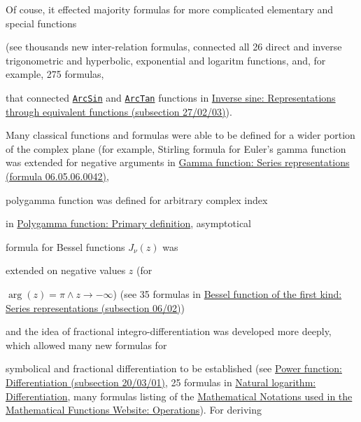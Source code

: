 Of couse, it effected majority formulas for more complicated elementary and special functions 

(see thousands new inter-relation formulas, connected all 26 direct and inverse trigonometric and hyperbolic, exponential and logaritm functions, and, for example, 275 formulas, 

that connected \href{http://reference.wolfram.com/language/ref/ArcSin.html}{\tt ArcSin} and \href{http://reference.wolfram.com/language/ref/ArcTan.html}{\tt ArcTan} functions in \href{http://functions.wolfram.com/ElementaryFunctions/ArcSin/27/02/03}{Inverse sine: Representations through equivalent functions (subsection 27/02/03)}).

Many classical functions and formulas were able to be defined for a wider portion of the complex plane  (for example, Stirling formula for Euler's gamma function was extended for negative arguments in \href{http://functions.wolfram.com/GammaBetaErf/Gamma/06/02/0005/}{Gamma function: Series representations (formula 06.05.06.0042)}, 

polygamma function was defined for arbitrary complex index

in \href{http://functions.wolfram.com/GammaBetaErf/PolyGamma2/02/}{Polygamma function: Primary definition}, asymptotical 

formula for Bessel functions $J_{\nu}(z)$ was 

extended on negative values $z$ (for 

${\arg (z) = \pi \land z \to -\infty}$) (see 35 formulas in \href{http://functions.wolfram.com/Bessel-TypeFunctions/BesselJ/06/02/}{Bessel function of the first kind: Series representations (subsection 06/02)}) 

and the idea of fractional integro-differentiation was developed more deeply, which allowed many new formulas for 


symbolical and fractional differentiation to be established (see \href{http://functions.wolfram.com/ElementaryFunctions/Power/20/03/01/}{Power function: Differentiation (subsection 20/03/01)}, 25 formulas in \href{http://functions.wolfram.com/ElementaryFunctions/Log/20/}{Natural logarithm: Differentiation}, many formulas listing of the  \href{http://functions.wolfram.com/Notations/3/}{Mathematical Notations used in the Mathematical Functions Website: Operations}). For deriving 

